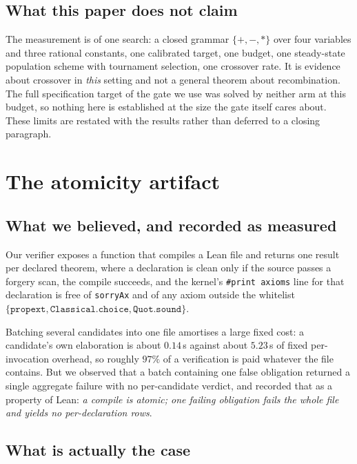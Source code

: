 \documentclass[11pt,a4paper]{article}
\theoremstyle{definition}
\theoremstyle{remark}
\begin{document}
\subsection{What this paper does not claim}

The measurement is of one search: a closed grammar $\{+,-,*\}$ over four
variables and three rational constants, one calibrated target, one budget, one
steady-state population scheme with tournament selection, one crossover rate.
It is evidence about crossover in \emph{this} setting and not a general theorem
about recombination. The full specification target of the gate we use was solved
by neither arm at this budget, so nothing here is established at the size the
gate itself cares about. These limits are restated with the results rather than
deferred to a closing paragraph.

\section{The atomicity artifact}\label{sec:atomicity}

\subsection{What we believed, and recorded as measured}

Our verifier exposes a function that compiles a Lean file and returns one result
per declared theorem, where a declaration is clean only if the source passes a
forgery scan, the compile succeeds, and the kernel's \texttt{\#print axioms}
line for that declaration is free of \texttt{sorryAx} and of any axiom outside
the whitelist $\{\texttt{propext}, \texttt{Classical.choice},
\texttt{Quot.sound}\}$.

Batching several candidates into one file amortises a large fixed cost: a
candidate's own elaboration is about $0.14$\,s against about $5.23$\,s of fixed
per-invocation overhead, so roughly $97\%$ of a verification is paid whatever
the file contains. But we observed that a batch containing one false obligation
returned a single aggregate failure with no per-candidate verdict, and recorded
that as a property of Lean: \emph{a compile is atomic; one failing obligation
fails the whole file and yields no per-declaration rows}.

\subsection{What is actually the case}
\end{document}
